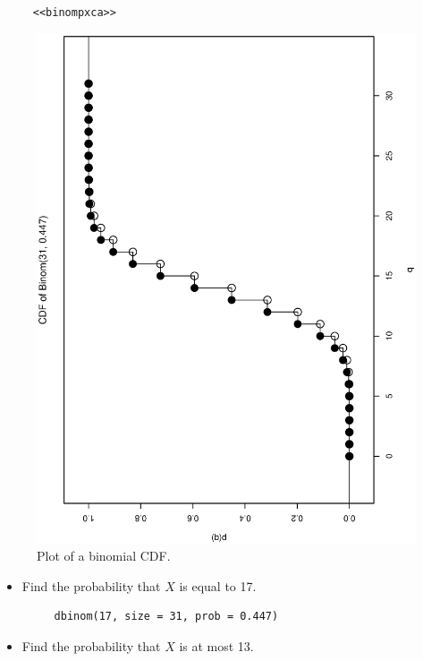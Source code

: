 \documentclass[captions=tableheading]{scrbook}
\begin{document}
\begin{xca}
\begin{verbatim}
     <<binompxca>>
\end{verbatim}
     \begin{figure}[th]
       \includegraphics[angle=270, totalheight=4in]{ps/binompxca.ps}
       \caption[Plot of a binomial CDF]{\small Plot of a binomial CDF.}
       \label{fig:binompxca}
     \end{figure}
\begin{itemize}
\item Find the probability that \(X\) is equal to 17.

\begin{verbatim}
     dbinom(17, size = 31, prob = 0.447)
\end{verbatim}
\end{itemize}
\begin{itemize}
\item Find the probability that \(X\) is at most 13.


\end{itemize}
\end{xca}
\end{document}
